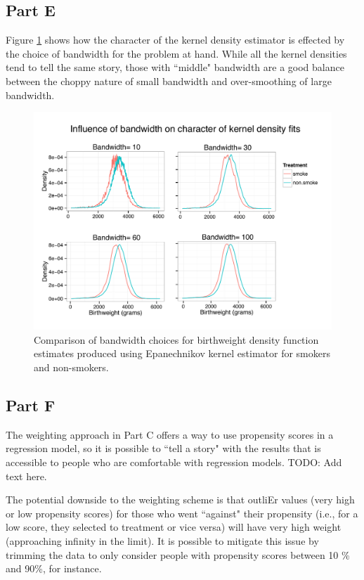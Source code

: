 \documentclass[letterpaper, 12pt]{article}
\begin{document}
\subsection{Part E}

Figure \ref{fig:kernelbw} shows how the character of the kernel density estimator is effected by the choice of bandwidth for the problem at hand.  While all the kernel densities tend to tell the same story, those with ``middle" bandwidth are a good balance between the choppy nature of small bandwidth and over-smoothing of large bandwidth.

\begin{figure}[h!]
   \centering
   \includegraphics[width=6in]{img/kdens-combinebw.pdf} 
   \caption{Comparison of bandwidth choices for birthweight density function estimates produced using Epanechnikov kernel estimator for smokers and non-smokers.}
   \label{fig:kernelbw}
\end{figure}

\subsection{Part F}

The weighting approach in Part C offers a way to use propensity scores in a regression model, so it is possible to ``tell a story" with the results that is accessible to people who are comfortable with regression models.  TODO: Add text here. 

The potential downside to the weighting scheme is that outliEr values (very high or low propensity scores) for those who went ``against" their propensity (i.e., for a low score, they selected to treatment or vice versa) will have very high weight (approaching infinity in the limit).  It is possible to mitigate this issue by trimming the data to only consider people with propensity scores between 10 \% and 90\%, for instance.  
\end{document}
